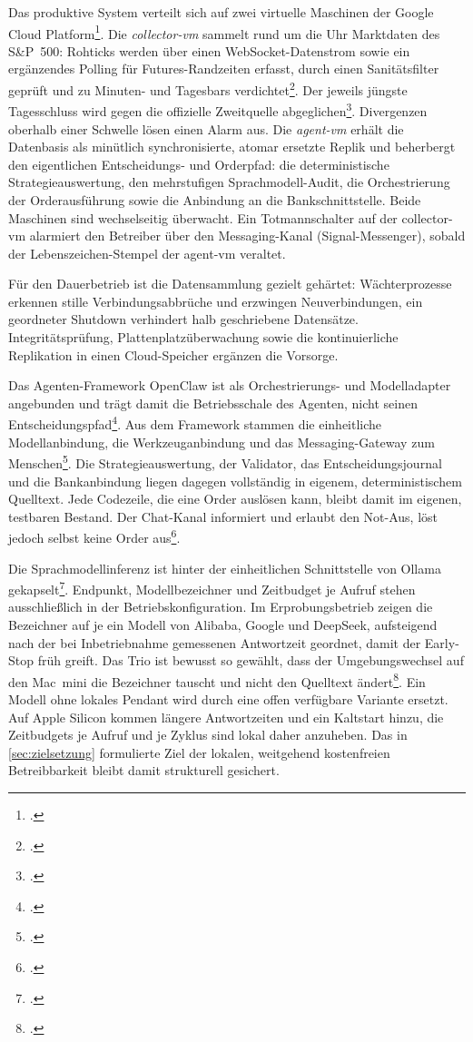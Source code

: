 Das produktive System verteilt sich auf zwei virtuelle Maschinen der Google Cloud
Platform\footcite[vgl.][]{gcpCompute2026}. Die \emph{collector-vm} sammelt rund um die Uhr
Marktdaten des S\&P~500: Rohticks werden über einen WebSocket-Datenstrom sowie ein
ergänzendes Polling für Futures-Randzeiten erfasst, durch einen Sanitätsfilter geprüft und
zu Minuten- und Tagesbars verdichtet\footcite[vgl.][]{yfinance2026}. Der jeweils jüngste Tagesschluss wird gegen die offizielle Zweitquelle 
abgeglichen\footcite[vgl.][]{fredSP500}. Divergenzen oberhalb einer
Schwelle lösen einen Alarm aus. Die \emph{agent-vm} erhält die Datenbasis als minütlich
synchronisierte, atomar ersetzte Replik und beherbergt den eigentlichen Entscheidungs- und
Orderpfad: die deterministische Strategieauswertung, den mehrstufigen Sprachmodell-Audit,
die Orchestrierung der Orderausführung sowie die Anbindung an die Bankschnittstelle. Beide
Maschinen sind wechselseitig überwacht. Ein Totmannschalter auf der collector-vm alarmiert
den Betreiber über den Messaging-Kanal (Signal-Messenger), sobald der Lebenszeichen-Stempel
der agent-vm veraltet.

Für den Dauerbetrieb ist die Datensammlung gezielt gehärtet: Wächterprozesse erkennen stille
Verbindungsabbrüche und erzwingen Neuverbindungen, ein geordneter Shutdown verhindert halb
geschriebene Datensätze. Integritätsprüfung, Plattenplatzüberwachung sowie die
kontinuierliche Replikation in einen Cloud-Speicher ergänzen die Vorsorge.

Das Agenten-Framework OpenClaw ist als Orchestrierungs- und Modelladapter angebunden und
trägt damit die Betriebsschale des Agenten, nicht seinen
Entscheidungspfad\footcite[vgl.][]{openclawDocs2026}. Aus dem Framework stammen die
einheitliche Modellanbindung, die Werkzeuganbindung und das Messaging-Gateway zum
Menschen\footcites[vgl.][]{openclawProviders2026}[vgl.][]{openclawGateway2026}. Die
Strategieauswertung, der Validator, das Entscheidungsjournal und die Bankanbindung liegen
dagegen vollständig in eigenem, deterministischem Quelltext. Jede Codezeile,
die eine Order auslösen kann, bleibt damit im eigenen, testbaren Bestand. Der Chat-Kanal
informiert und erlaubt den Not-Aus, löst jedoch selbst keine Order
aus\footcite[vgl.][]{openclawSignal2026}.

Die Sprachmodellinferenz ist hinter der einheitlichen Schnittstelle von Ollama
gekapselt\footcite[vgl.][]{ollama2026}. Endpunkt, Modellbezeichner und Zeitbudget je Aufruf
stehen ausschließlich in der Betriebskonfiguration. Im Erprobungsbetrieb zeigen die
Bezeichner auf je ein Modell von Alibaba, Google und DeepSeek, aufsteigend nach der bei
Inbetriebnahme gemessenen Antwortzeit geordnet, damit der Early-Stop früh greift. Das Trio ist bewusst so gewählt,
dass der Umgebungswechsel auf den Mac~mini die Bezeichner tauscht und nicht den Quelltext
ändert\footcite[vgl.][]{appleMacmini2026}. Ein Modell ohne lokales Pendant wird durch
eine offen verfügbare Variante ersetzt. Auf Apple Silicon kommen längere Antwortzeiten und ein Kaltstart hinzu, die Zeitbudgets je Aufruf und je Zyklus sind lokal daher anzuheben. Das in
\cref{sec:zielsetzung} formulierte Ziel der lokalen, weitgehend kostenfreien Betreibbarkeit
bleibt damit strukturell gesichert.

